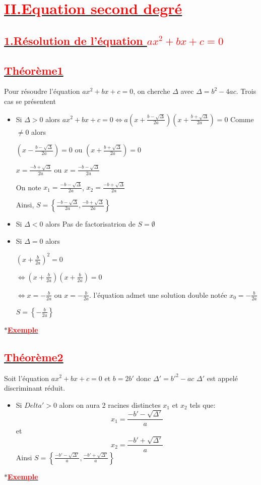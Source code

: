 \documentclass[12pt]{article}
\begin{document}
\section*{\underline{\textbf{\textcolor{red}{II.Equation second degré}}}}
\subsection*{\underline{\textbf{\textcolor{red}{1.Résolution de l'équation $ax^{2}+bx+c=0$}}}}
\subsection*{\underline{\textbf{\textcolor{red}{Théorème1}}}}
Pour résoudre l'équation $ax^{2}+bx+c=0$, on cherche $\Delta$ avec $\Delta=b^{2}-4ac$.
Trois cas se présentent\\
\begin{itemize}
\item Si $\Delta >0$ alors
$ax^{2}+bx+c=0 \Leftrightarrow a\left(x+\frac{b-\sqrt{\Delta}}{2a} \right)\left(x+\frac{b+\sqrt{\Delta}}{2a} \right)=0$
Comme $\neq 0$ alors 

$ \left(x-\frac{b-\sqrt{\Delta}}{2a} \right)=0$ ou 
$\left(x+\frac{b+\sqrt{\Delta}}{2a} \right)=0$

$x=\frac{-b+\sqrt{\Delta}}{2a}$ ou $x=\frac{-b-\sqrt{\Delta}}{2a}$

On note $x_{1}=\frac{-b-\sqrt{\Delta}}{2a}$, $x_{2}=\frac{-b+\sqrt{\Delta}}{2a}$

Ainsi, $S=\left\lbrace \frac{-b-\sqrt{\Delta}}{2a}, \frac{-b+\sqrt{\Delta}}{2a} \right\rbrace $
\item Si $\Delta < 0$ alors Pas de factorisatrion de $S=\emptyset$
\item Si $\Delta = 0$ alors 

$\left( x+\frac{b}{2a}\right)^{2}=0$

$\Leftrightarrow \left( x+\frac{b}{2a}\right) \left( x+\frac{b}{2a}\right)=0$ 

$\Leftrightarrow x=-\frac{b}{2a}$ ou $x=-\frac{b}{2a}$.
l'équation admet une solution double notée $x_{0}=-\frac{b}{2a}$

$ S = \left\lbrace -\frac{b}{2a} \right\rbrace  $
\end{itemize}
$\ast$\underline{\textbf{\textcolor{red}{Exemple}}}\\
\subsection*{\underline{\textbf{\textcolor{red}{Théorème2}}}}
Soit l'équation $ax^{2}+bx+c=0$ et $b=2b'$ donc $\Delta'=b'^{2}-ac$
$\Delta'$ est appelé discriminant réduit.
\begin{itemize}
    \item Si $Delta' >0$ alors on aura 2 racines distinctes $x_{1}$ et $x_{2}$ tels que:
            \[x_{1}=\frac{-b'-\sqrt{\Delta'}}{a}\] et \[x_{2}=\frac{-b'+\sqrt{\Delta'}}{a}\]
            Ainsi $S=\left\lbrace \frac{-b'-\sqrt{\Delta'}}{a}, \frac{-b'+\sqrt{\Delta'}}{a} \right\rbrace$
        \end{itemize}
$\ast$\underline{\textbf{\textcolor{red}{Exemple}}}\\
\end{document}
